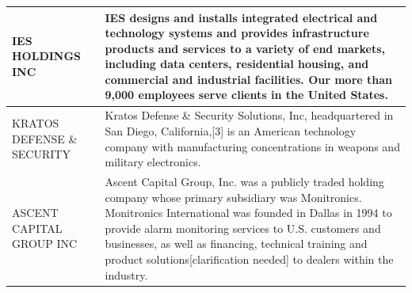 \begin{tabular}{>{\raggedright\arraybackslash}p{3.5cm}>{\raggedright\arraybackslash}p{20cm}}
   \midrule
IES HOLDINGS INC & IES designs and installs integrated electrical and technology systems and provides infrastructure products and services to a variety of end markets, including data centers, residential housing, and commercial and industrial facilities. Our more than 9,000 employees serve clients in the United States. \\ 
   \midrule
KRATOS DEFENSE \& SECURITY & Kratos Defense \& Security Solutions, Inc, headquartered in San Diego, California,[3] is an American technology company with manufacturing concentrations in weapons and military electronics. \\ 
   \midrule
ASCENT CAPITAL GROUP INC & Ascent Capital Group, Inc. was a publicly traded holding company whose primary subsidiary was Monitronics. Monitronics International was founded in Dallas in 1994 to provide alarm monitoring services to U.S. customers and businesses, as well as financing, technical training and product solutions[clarification needed] to dealers within the industry. \\ 
   \bottomrule
\end{tabular}
